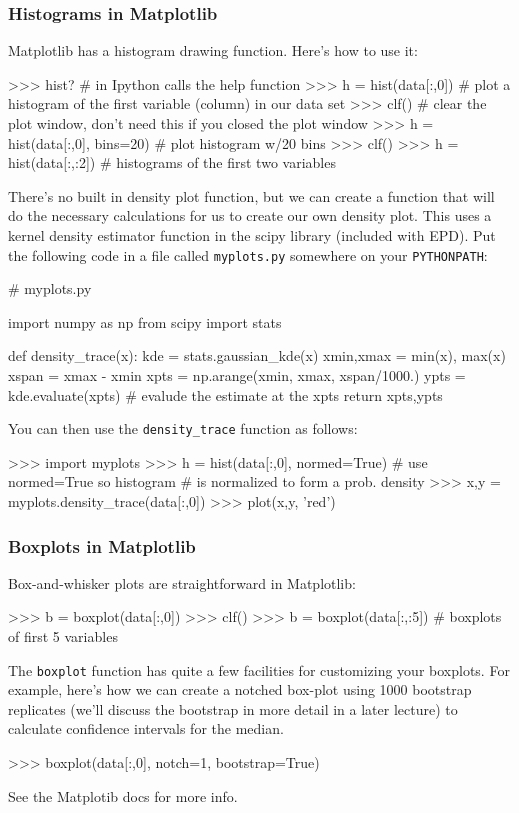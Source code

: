 \subsubsection{Histograms in Matplotlib}

Matplotlib has a histogram drawing function. Here's how to use it:
%
\begin{python}
>>> hist? # in Ipython calls the help function
>>> h = hist(data[:,0]) # plot a histogram of the first variable (column) in our data set
>>> clf() # clear the plot window, don't need this if you closed the plot window
>>> h = hist(data[:,0], bins=20) # plot histogram w/20 bins
>>> clf()
>>> h = hist(data[:,:2])  # histograms of the first two variables    
\end{python}

There's no built in density plot function, but we can create a function
that will do the necessary calculations for us to create our own density
plot. This uses a kernel density estimator function in the scipy library
(included with EPD). Put the following code in a file called
\lstinline!myplots.py! somewhere on your \lstinline!PYTHONPATH!:
%
\begin{python}
# myplots.py

import numpy as np
from scipy import stats

def density_trace(x):
    kde = stats.gaussian_kde(x)
    xmin,xmax = min(x), max(x)
    xspan = xmax - xmin
    xpts = np.arange(xmin, xmax, xspan/1000.)
    ypts = kde.evaluate(xpts) # evalude the estimate at the xpts
    return xpts,ypts
\end{python}

You can then use the \lstinline!density_trace! function as follows:
%
\begin{python}
>>> import myplots
>>> h = hist(data[:,0], normed=True) # use normed=True so histogram 
                           # is normalized to form a prob. density
>>> x,y = myplots.density_trace(data[:,0])
>>> plot(x,y, 'red')    
\end{python}

\subsubsection{Boxplots in Matplotlib}

Box-and-whisker plots are straightforward in Matplotlib:
%
\begin{python}
>>> b = boxplot(data[:,0])
>>> clf()
>>> b = boxplot(data[:,:5]) # boxplots of first 5 variables
\end{python}
%
The \lstinline!boxplot! function has quite a few facilities for
customizing your boxplots. For example, here's how we can create a
notched box-plot using 1000 bootstrap replicates (we'll discuss the
bootstrap in more detail in a later lecture) to calculate confidence
intervals for the median.
%
\begin{python}
>>> boxplot(data[:,0], notch=1, bootstrap=True)    
\end{python}
See the Matplotib docs for more info.

